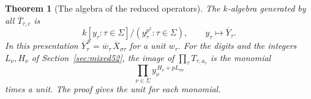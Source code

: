 \documentclass[a4paper,11pt]{article}
\newtheorem{theorem}[proposition]{Theorem}
\theoremstyle{definition}
\theoremstyle{remark}
\numberwithin{equation}{section}
\begin{document}
\begin{theorem}[The algebra of the reduced operators]\label{thm:algebra54}
The \(k\)-algebra generated by all \(\overline T_{\tau,c}\) is
\begin{equation}
 k[y_\tau:\tau\in\Sigma]\big/(y_\tau^{p^2}:\tau\in\Sigma),
                   \qquad y_\tau\longmapsto\overline Y_\tau .
                                                           \label{eq:algebra54}
\end{equation}
In this presentation \(\overline Y_\tau^{\,p}
=\overline w_\tau\,\overline X_{\sigma\tau}\) for a unit \(w_\tau\).
For the digits and the integers \(L_\nu,H_\nu\) of
Section~\ref{sec:mixed52}, the image of
\(\prod_\tau T_{\tau,a_\tau}\) is the monomial
\[
         \prod_{\nu\in\Sigma} y_\nu^{\,H_\nu+pL_{\sigma\nu}}
\]
times a unit. The proof gives the unit for each monomial.
\end{theorem}
\end{document}
